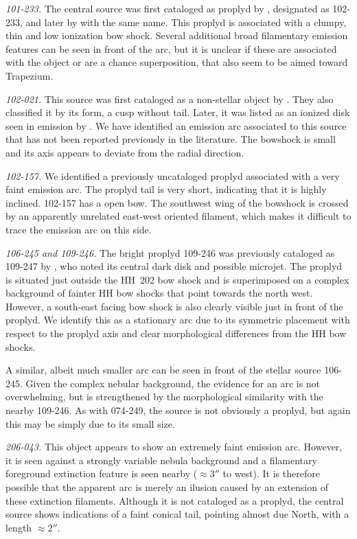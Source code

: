 \documentclass[apj, twocolumn]{aastex63}
\begin{document}
\textit{101-233.} The central source was first cataloged
as proplyd by \citet{ODell:1996a}, designated as 102-233,
and later by \citet{Ricci:2008a} with the same name. This
proplyd is associated with a clumpy, thin and low ionization
bow shock. Several additional broad filamentary emission
features can be seen in front of the arc, but it is unclear
if these are associated with the object or are a chance
superposition, that also seem to be aimed toward Trapezium. 

\textit{102-021.} This source was first cataloged as a non-stellar
object by \citet{ODell:1996a}. They also classified it by its form,
a cusp without tail. Later, it was listed as an ionized disk seen
in emission by \citet{Ricci:2008a}. We have identified an emission
arc associated to this source that has not been reported previously
in the literature. The  bowshock is small and its axis appears to
deviate from the radial direction. 

\textit{102-157.} We identified a previously uncataloged
proplyd associated with a very faint emission arc. The proplyd
tail is very short, indicating that it is highly inclined.
102-157 has a open bow. The southwest wing of the bowshock
is crossed by an apparently unrelated east-west oriented
filament, which makes it difficult to trace the emission
arc on this side.


\textit{106-245 and 109-246.} The bright proplyd 109-246
\citep{Ricci:2008a} was previously cataloged as 109-247 by
\citet{Bally:2000a}, who noted its central dark disk and
possible microjet.  The proplyd is situated just outside
the HH~202 bow shock and is superimposed on a complex
background of fainter HH bow shocks that point towards
the north west.  However, a south-east facing bow shock
is also clearly visible just in front of
the proplyd.  We identify this as a stationary arc due to its
symmetric placement with respect to the proplyd axis and clear
morphological differences from the HH bow shocks.

A similar, albeit much smaller arc can be seen in front of the
stellar source 106-245.  Given the complex nebular background,
the evidence for an arc is not overwhelming, but is strengthened
by the morphological similarity with the nearby 109-246.  As
with 074-249, the source is not obviously a proplyd, but again
this may be simply due to its small size.    


\textit{206-043.} This object appears to show an extremely faint
emission arc.  However, it is seen against a strongly variable nebula
background and a filamentary foreground extinction feature is seen
nearby (\(\approx 3''\) to west).  It is therefore possible that
the apparent arc is merely an ilusion caused by an extension of these
extinction filaments.  Although it is not cataloged as a proplyd, the
central source shows indications of a faint conical tail, pointing
almost due North, with a length \(\approx 2''\). 
\end{document}
